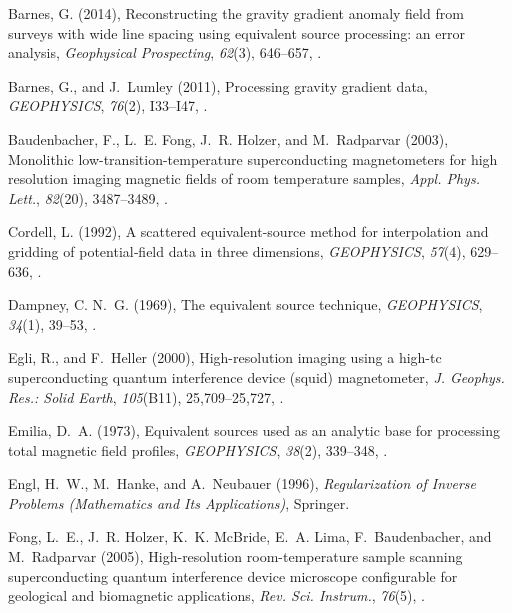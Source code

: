\documentclass[galley,gc]{agutex}
\begin{document}
\begin{article}
\begin{thebibliography}{42}
Barnes, G. (2014), Reconstructing the gravity gradient anomaly field from
  surveys with wide line spacing using equivalent source processing: an error
  analysis, \textit{Geophysical Prospecting}, \textit{62}(3), 646--657,
  .

Barnes, G., and J.~Lumley (2011), Processing gravity gradient data,
  \textit{GEOPHYSICS}, \textit{76}(2), I33--I47, .

Baudenbacher, F., L.~E. Fong, J.~R. Holzer, and M.~Radparvar (2003), Monolithic
  low-transition-temperature superconducting magnetometers for high resolution
  imaging magnetic fields of room temperature samples, \textit{Appl. Phys.
  Lett.}, \textit{82}(20), 3487--3489,
  .

Cordell, L. (1992), A scattered equivalent-source method for interpolation and
  gridding of potential‐field data in three dimensions, \textit{GEOPHYSICS},
  \textit{57}(4), 629--636, .

Dampney, C. N.~G. (1969), The equivalent source technique, \textit{GEOPHYSICS},
  \textit{34}(1), 39--53, .

Egli, R., and F.~Heller (2000), High-resolution imaging using a high-tc
  superconducting quantum interference device (squid) magnetometer, \textit{J.
  Geophys. Res.: Solid Earth}, \textit{105}(B11), 25,709--25,727,
  .

Emilia, D.~A. (1973), Equivalent sources used as an analytic base for
  processing total magnetic field profiles, \textit{GEOPHYSICS},
  \textit{38}(2), 339--348, .

Engl, H.~W., M.~Hanke, and A.~Neubauer (1996), \textit{Regularization of
  Inverse Problems (Mathematics and Its Applications)}, Springer.

Fong, L.~E., J.~R. Holzer, K.~K. McBride, E.~A. Lima, F.~Baudenbacher, and
  M.~Radparvar (2005), High-resolution room-temperature sample scanning
  superconducting quantum interference device microscope configurable for
  geological and biomagnetic applications, \textit{Rev. Sci. Instrum.},
  \textit{76}(5), .


\end{thebibliography}
\end{article}
\end{document}
